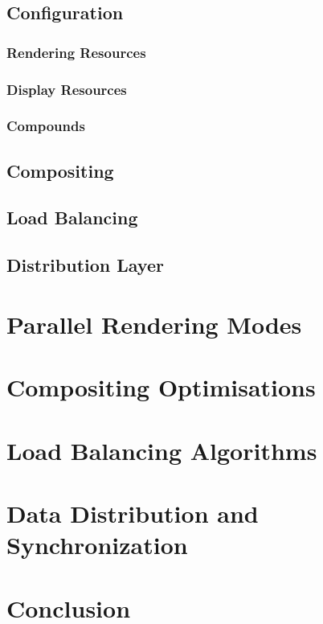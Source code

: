 \section{Configuration}
\subsection{Rendering Resources}
\subsection{Display Resources}
\subsection{Compounds}

\section{Compositing}

\section{Load Balancing}

\section{Distribution Layer}


\chapter{Parallel Rendering Modes}


\chapter{Compositing Optimisations}


\chapter{Load Balancing Algorithms}


\chapter{Data Distribution and Synchronization}


\chapter{Conclusion}

